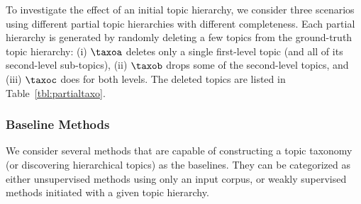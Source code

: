 \begin{table}[t]
\caption{The topic classes deleted from the original topic hierarchy. ($\rightarrow\ast$) denotes all the sub-topics.}
\label{tbl:partialtaxo}
\centering
{}
\end{table}

To investigate the effect of an initial topic hierarchy, we consider three scenarios using different partial topic hierarchies with different completeness.
Each partial hierarchy is generated by randomly deleting a few topics from the ground-truth topic hierarchy:
(i) $\taxoa$ deletes only a single first-level topic (and all of its second-level sub-topics), (ii) $\taxob$ drops some of the second-level topics, and (iii) $\taxoc$ does for both levels.
The deleted topics are listed in Table~\ref{tbl:partialtaxo}.

\subsubsection{Baseline Methods}
We consider several methods that are capable of constructing a topic taxonomy (or discovering hierarchical topics) as the baselines.
They can be categorized as either unsupervised methods using only an input corpus, or weakly supervised methods initiated with a given topic hierarchy.

